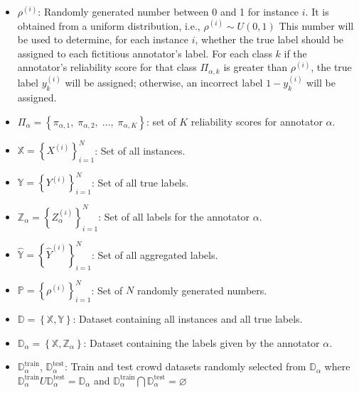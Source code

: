 \begin{itemize}[itemsep=1em]
    \item  $\rho^{(i)}$: Randomly generated number  between 0 and 1 for instance $i $. It is obtained from a uniform distribution, i.e., $\rho^{(i)} \sim U(0,1) $ This number will be used to determine, for each instance $i$, whether the true label should be assigned to each fictitious annotator's label. For each class $k$ if the annotator's reliability score for that class ${\Pi}_{\alpha,k}$ is greater than $\rho^{(i)}$, the true label $y_k^{(i)}$ will be assigned; otherwise, an incorrect label $1 - y_k^{(i)}$  will be assigned.

    \item  ${\Pi}_\alpha=\left\{\pi_{\alpha,1},\;\pi_{\alpha,2},\;\dots,\;\pi_{\alpha,K}\right\} $: set of $K $ reliability scores for annotator $\alpha $.

    \item  $\mathbb{X} = {\left\{X^{(i)}\right\}}_{i=1}^{N} $: Set of all instances.

    \item  $\mathbb{Y} = {\left\{Y^{(i)}\right\}}_{i=1}^{N} $: Set of all true labels.

    \item  $\mathbb{Z}_\alpha = {\left\{Z_\alpha^{(i)}\right\}}_{i=1}^{N} $: Set of all labels for the annotator $\alpha $.

    \item  $\widehat{\mathbb{Y}} = {\left\{\widehat{Y}^{(i)}\right\}}_{i=1}^{N} $: Set of all aggregated labels.

    \item  $\mathbb{P} = {\left\{\rho^{(i)}\right\}}_{i=1}^{N} $: Set of $N $ randomly generated numbers.

    \item  $\mathbb{D}=\left\{\mathbb{X},\mathbb{Y}\right\} $: Dataset containing all instances and all true labels.

    \item  $\mathbb{D}_\alpha=\left\{\mathbb{X},\mathbb{Z}_\alpha\right\} $: Dataset containing the labels given by the annotator $\alpha $.

    \item  $\mathbb{D}_\alpha^\text{train}$, $\mathbb{D}_\alpha^{\text{test}} $: Train and test crowd datasets randomly selected from $\mathbb{D}_{\alpha} $ where $\mathbb{D}_\alpha^{\text{train}} U \mathbb{D}_\alpha^{\text{test}} = \mathbb{D}_\alpha $ and $\mathbb{D}_\alpha^{\text{train}} \bigcap \mathbb{D}_{\alpha}^{\text{test}}=\varnothing $


\end{itemize}
